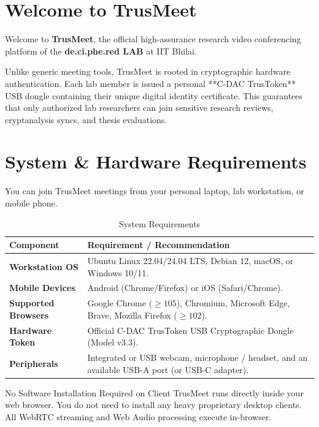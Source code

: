 \documentclass[11pt,a4paper]{report}
\begin{document}
\section{Welcome to TrusMeet}
Welcome to \textbf{TrusMeet}, the official high-assurance research video conferencing platform of the \textbf{de.ci.phe.red LAB} at IIT Bhilai. 

Unlike generic meeting tools, TrusMeet is rooted in cryptographic hardware authentication. Each lab member is issued a personal **C-DAC TrusToken** USB dongle containing their unique digital identity certificate. This guarantees that only authorized lab researchers can join sensitive research reviews, cryptanalysis syncs, and thesis evaluations.

\section{System \& Hardware Requirements}
You can join TrusMeet meetings from your personal laptop, lab workstation, or mobile phone.

\begin{table}[h!]
\centering
\small
\begin{tabularx}{\textwidth}{p{3.5cm}X}
\toprule
\textbf{Component} & \textbf{Requirement / Recommendation} \\
\midrule
\textbf{Workstation OS} & Ubuntu Linux 22.04/24.04 LTS, Debian 12, macOS, or Windows 10/11. \\
\textbf{Mobile Devices} & Android (Chrome/Firefox) or iOS (Safari/Chrome). \\
\textbf{Supported Browsers} & Google Chrome ($\ge 105$), Chromium, Microsoft Edge, Brave, Mozilla Firefox ($\ge 102$). \\
\textbf{Hardware Token} & Official C-DAC TrusToken USB Cryptographic Dongle (Model v3.3). \\
\textbf{Peripherals} & Integrated or USB webcam, microphone / headset, and an available USB-A port (or USB-C adapter). \\
\bottomrule
\end{tabularx}
\caption{System Requirements}
\end{table}

\begin{tipbox}{No Software Installation Required on Client}
TrusMeet runs directly inside your web browser. You do not need to install any heavy proprietary desktop clients. All WebRTC streaming and Web Audio processing execute in-browser.
\end{tipbox}
\end{document}
